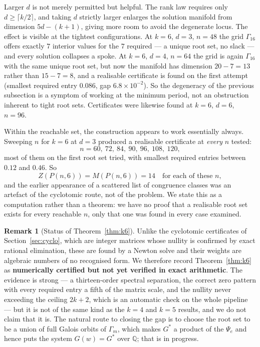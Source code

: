 \documentclass[11pt]{article}
\theoremstyle{definition}
\newtheorem{remark}[theorem]{Remark}
\begin{document}
Larger $d$ is not merely permitted but helpful. The rank law requires only
$d\ge\lceil k/2\rceil$, and taking $d$ strictly larger enlarges the solution
manifold from dimension $5d-(k+1)$, giving more room to avoid the degenerate
locus. The effect is visible at the tightest configurations. At $k=6$, $d=3$,
$n=48$ the grid $\Gamma_{16}$ offers exactly $7$ interior values for the $7$
required --- a unique root set, no slack --- and every solution collapses a
spoke. At $k=6$, $d=4$, $n=64$ the grid is again $\Gamma_{16}$ with the same
unique root set, but now the manifold has dimension $20-7=13$ rather than
$15-7=8$, and a realisable certificate is found on the first attempt
(smallest required entry $0.086$, gap $6.8\times10^{-2}$). So the degeneracy
of the previous subsection is a symptom of working at the minimum period, not
an obstruction inherent to tight root sets. Certificates were likewise found at
$k=6$, $d=6$, $n=96$.

Within the reachable set, the construction appears to work essentially always. Sweeping $n$ for $k=6$ at $d=3$ produced a realisable
certificate at \emph{every} $n$ tested:
\[
  n=60,\ 72,\ 84,\ 90,\ 96,\ 108,\ 120,
\]
most of them on the first root set tried, with smallest required entries
between $0.12$ and $0.46$. So
\[
  Z(P(n,6))=M(P(n,6))=14 \quad\text{for each of these } n,
\]
and the earlier appearance of a scattered list of congruence classes was an
artefact of the cyclotomic route, not of the problem. We state this as a
computation rather than a theorem: we have no proof that a realisable root set
exists for every reachable $n$, only that one was found in every case examined.

\begin{remark}[Status of Theorem~\ref{thm:k6}]
Unlike the cyclotomic certificates of Section~\ref{sec:cyclo}, which are
integer matrices whose nullity is confirmed by exact rational elimination,
these are found by a Newton solve and their weights are algebraic numbers of no
recognised form. We therefore record Theorem~\ref{thm:k6} as
\textbf{numerically certified but not yet verified in exact arithmetic}. The
evidence is strong --- a thirteen-order spectral separation, the correct zero
pattern with every required entry a fifth of the matrix scale, and the nullity
never exceeding the ceiling $2k+2$, which is an automatic check on the whole
pipeline --- but it is not of the same kind as the $k=4$ and $k=5$ results, and
we do not claim that it is. The natural route to closing the gap is to choose
the root set to be a union of full Galois orbits of $\Gamma_m$, which makes
$G^\ast$ a product of the $\Psi_e$ and hence puts the system $G(w)=G^\ast$ over
$\mathbb Q$; that is in progress.
\end{remark}
\end{document}
